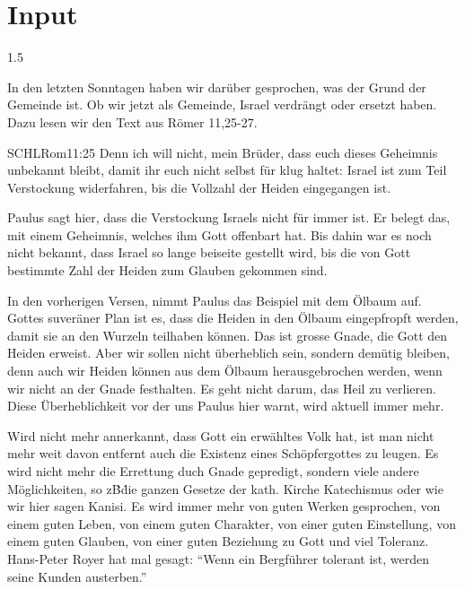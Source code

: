 \documentclass[fontsize=14pt]{../../inc/mybib}
\begin{document}
\section{ Input }
\begin{spacing}{1.5}
    \begin{block}
        In den letzten Sonntagen haben wir darüber gesprochen, was der Grund der Gemeinde ist. Ob wir jetzt als Gemeinde, Israel verdrängt oder ersetzt haben. Dazu lesen wir den Text aus Römer 11,25-27.
        \begin{bibelbox}{SCHL}{Rom}{11:25}
            Denn ich will nicht, mein Brüder, dass euch dieses Geheimnis unbekannt bleibt, damit ihr euch nicht selbst für klug haltet: Israel ist zum Teil Verstockung widerfahren, bis die Vollzahl der Heiden eingegangen ist.
        \end{bibelbox}
        Paulus sagt hier, dass die Verstockung Israels nicht für immer ist. Er belegt das, mit einem Geheimnis, welches ihm Gott offenbart hat. Bis dahin war es noch nicht bekannt, dass Israel so lange beiseite gestellt wird, bis die von Gott bestimmte Zahl der Heiden zum Glauben gekommen sind.

        In den vorherigen Versen, nimmt Paulus das Beispiel mit dem Ölbaum auf. Gottes suveräner Plan ist es, dass die Heiden in den Ölbaum eingepfropft werden, damit sie an den Wurzeln teilhaben können. Das ist  grosse Gnade, die Gott den Heiden erweist. Aber wir sollen nicht überheblich sein, sondern demütig bleiben, denn auch wir Heiden können aus dem Ölbaum herausgebrochen werden, wenn wir nicht an der Gnade festhalten. Es geht nicht darum, das Heil zu verlieren. Diese Überheblichkeit vor der uns Paulus hier warnt, wird aktuell immer mehr. 
        
        Wird nicht mehr annerkannt, dass Gott ein erwähltes Volk hat, ist man nicht mehr weit davon entfernt auch die Existenz eines Schöpfergottes zu leugen. Es wird nicht mehr die Errettung duch Gnade gepredigt, sondern viele andere Möglichkeiten, so z\.B\. die ganzen Gesetze der kath. Kirche Katechismus oder wie wir hier sagen Kanisi. Es wird immer mehr von guten Werken gesprochen, von einem guten Leben, von einem guten Charakter, von einer guten Einstellung, von einem guten Glauben, von einer guten Beziehung zu Gott und viel Toleranz. Hans-Peter Royer hat mal gesagt: \enquote{Wenn ein Bergführer tolerant ist, werden seine Kunden austerben.}


\end{block}
\end{spacing}
\end{document}
